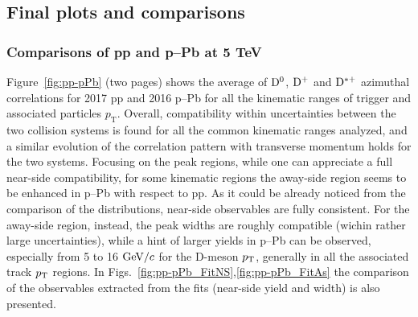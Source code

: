 \subsection{Final plots and comparisons}

\subsubsection{Comparisons of pp and p--Pb at 5 TeV}
Figure~\ref{fig:pp-pPb} (two pages) shows the average of ${\rm D^0}$, ${\rm D^+}$ and ${\rm D^{*+}}$ azimuthal correlations for 2017 pp and 2016 p--Pb for all the kinematic ranges of trigger and associated particles $p_\mathrm{T}$. Overall, compatibility within uncertainties between the two collision systems is found for all the common kinematic ranges analyzed, and a similar evolution of the correlation pattern with transverse momentum holds for the two systems. Focusing on the peak regions, while one can appreciate a full near-side compatibility, for some kinematic regions the away-side region seems to be enhanced in p--Pb with respect to pp. As it could be already noticed from the comparison of the distributions, near-side observables are fully consistent. For the away-side region, instead, the peak widths are roughly compatible (wichin rather large uncertainties), while a hint of larger yields in p--Pb can be observed, especially from 5 to 16 $\mathrm{GeV}/c$ for the D-meson $p_{\rm T}$, generally in all the associated track $p_{\rm T}$ regions. In Figs.~\ref{fig:pp-pPb_FitNS},\ref{fig:pp-pPb_FitAs} the comparison of the observables extracted from the fits (near-side yield and width) is also presented.

